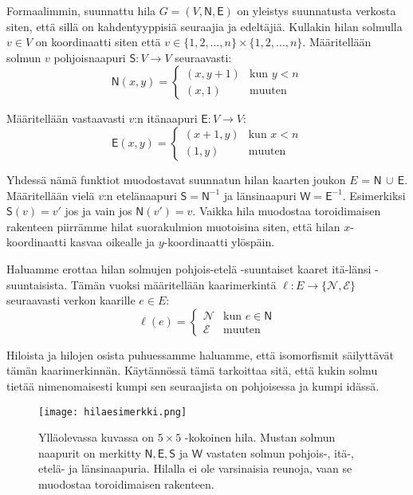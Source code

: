 \documentclass[12pt,finnish]{tktltiki2}
\theoremstyle{definition}
\theoremstyle{remark}
\begin{document}
Formaalimmin, suunnattu hila $G = (V, \mathsf{N}, \mathsf{E})$ on yleistys suunnatusta verkosta siten, että sillä on kahdentyyppisiä seuraajia ja edeltäjiä. Kullakin hilan solmulla $v \in V$ on koordinaatti siten että $v \in \{1, 2, \ldots, n\} \times \{1, 2, \ldots, n\}$. Määritellään solmun $v$ pohjoisnaapuri $\mathsf{S}: V \rightarrow V$ seuraavasti:
\[ \mathsf{N}(x, y) = 
  \begin{cases}
   (x, y+1) & \text{kun } y < n \\
   (x, 1) & \text{muuten}
  \end{cases}
\]

Määritellään vastaavasti $v$:n itänaapuri $\mathsf{E}: V \rightarrow V$:
\[ \mathsf{E}(x, y) = 
  \begin{cases}
   (x+1, y) & \text{kun } x < n \\
   (1, y) & \text{muuten}
  \end{cases}
\]

Yhdessä nämä funktiot muodostavat suunnatun hilan kaarten joukon $E$ = $\mathsf{N} \, \cup \, \mathsf{E}$. Määritellään vielä $v$:n etelänaapuri $\mathsf{S} = \mathsf{N}^{-1}$ ja länsinaapuri $\mathsf{W} = \mathsf{E}^{-1}$. Esimerkiksi $\mathsf{S}(v) = v'$ jos ja vain jos $\mathsf{N}(v') = v$. Vaikka hila muodostaa toroidimaisen rakenteen piirrämme hilat suorakulmion muotoisina siten, että hilan $x$-koordinaatti kasvaa oikealle ja $y$-koordinaatti ylöspäin.

Haluamme erottaa hilan solmujen pohjois-etelä -suuntaiset kaaret itä-länsi -suuntaisista. Tämän vuoksi määritellään kaarimerkintä $\ell: E \rightarrow \{\mathcal{N}, \mathcal{E}\}$ seuraavasti verkon kaarille $e \in E$:
\[ \ell(e) = 
  \begin{cases}
   \mathcal{N} & \text{kun } e \in \mathsf{N} \\
   \mathcal{E} & \text{muuten}
  \end{cases}
\]

Hiloista ja hilojen osista puhuessamme haluamme, että isomorfismit säilyttävät tämän kaarimerkinnän. Käytännössä tämä tarkoittaa sitä, että kukin solmu tietää nimenomaisesti kumpi sen seuraajista on pohjoisessa ja kumpi idässä.

\begin{figure}
  \centering
  \texttt{[image: hilaesimerkki.png]}
  \caption{Ylläolevassa kuvassa on $5 \times 5$ -kokoinen hila. Mustan solmun naapurit on merkitty $\mathsf{N}, \mathsf{E}, \mathsf{S}$ ja $\mathsf{W}$ vastaten solmun pohjois-, itä-, etelä- ja länsinaapuria. Hilalla ei ole varsinaisia reunoja, vaan se muodostaa toroidimaisen rakenteen. }
\end{figure}
\end{document}

